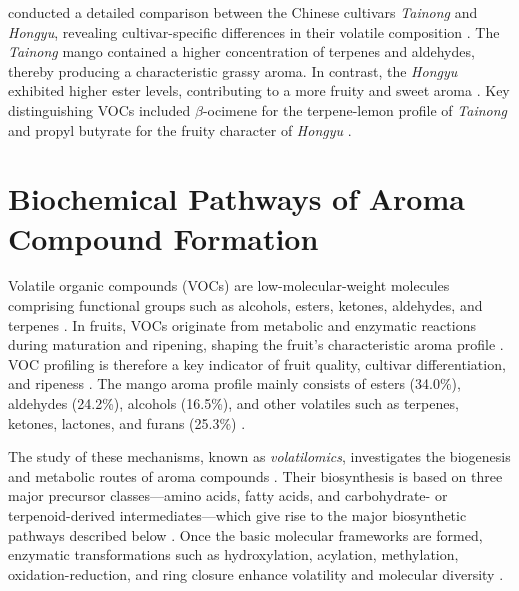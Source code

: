 \vspace{1em}
\textcite{A15_Xie2023} conducted a detailed comparison between the Chinese cultivars \textit{Tainong} and \textit{Hongyu}, revealing cultivar-specific differences in their volatile composition \cite*{A15_Xie2023}. The \textit{Tainong} mango contained a higher concentration of terpenes and aldehydes, thereby producing a characteristic grassy aroma.  In contrast, the \textit{Hongyu} exhibited higher ester levels, contributing to a more fruity and sweet aroma \cite*{A15_Xie2023}. Key distinguishing VOCs included $\beta$-ocimene for the terpene-lemon profile of \textit{Tainong} and propyl butyrate for the fruity character of \textit{Hongyu} \cite*{A15_Xie2023}.

\section{Biochemical Pathways of Aroma Compound Formation}
Volatile organic compounds (VOCs) are low-molecular-weight molecules comprising functional groups such as alcohols, esters, ketones, aldehydes, and terpenes \cite*{A01_Aguirre-Lopez_2023,B01_TerpenesTerpenoids_2018}. In fruits, VOCs originate from metabolic and enzymatic reactions during maturation and ripening, shaping the fruit’s characteristic aroma profile \cite*{A01_Aguirre-Lopez_2023}. VOC profiling is therefore a key indicator of fruit quality, cultivar differentiation, and ripeness \cite*{A01_Aguirre-Lopez_2023}. The mango aroma profile mainly consists of esters (34.0\%), aldehydes (24.2\%), alcohols (16.5\%), and other volatiles such as terpenes, ketones, lactones, and furans (25.3\%) \cite*{A01_Aguirre-Lopez_2023}.

\vspace{1em}
The study of these mechanisms, known as \textit{volatilomics}, investigates the biogenesis and metabolic routes of aroma compounds \cite*{A01_Aguirre-Lopez_2023}. Their biosynthesis is based on three major precursor classes—amino acids, fatty acids, and carbohydrate- or terpenoid-derived intermediates—which give rise to the major biosynthetic pathways described below \cite*{A13_ElHadi2013}. Once the basic molecular frameworks are formed, enzymatic transformations such as hydroxylation, acylation, methylation, oxidation-reduction, and ring closure enhance volatility and molecular diversity \cite*{A13_ElHadi2013}.

